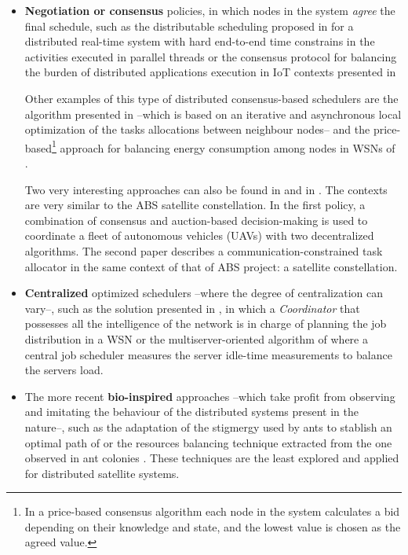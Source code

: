 \begin{itemize}
\item \textbf{Negotiation or consensus} policies, in which nodes in the system \emph{agree} the final schedule, such as the distributable scheduling proposed in \cite{anderson2007consensus} for a distributed real-time system with hard end-to-end time constrains in the activities executed in parallel threads or the consensus protocol for balancing the burden of distributed applications execution in IoT contexts presented in \cite{colistra2014problem} 

Other examples of this type of distributed consensus-based schedulers are the algorithm presented in \cite{pilloni2012decentralized} --which is based on an iterative and asynchronous local optimization of the tasks allocations between neighbour nodes-- and the price-based\footnote{In a price-based consensus algorithm each node in the system calculates a bid depending on their knowledge and state, and the lowest value is chosen as the agreed value.} approach for balancing energy consumption among nodes in WSNs of \cite{Edalat09}.

Two very interesting approaches can also be found in \cite{choi2009consensus} and in \cite{bonnet2008coordination}. The contexts are very similar to the ABS satellite constellation. In the first policy, a combination of consensus and auction-based decision-making is used to coordinate a fleet of autonomous vehicles (UAVs) with two decentralized algorithms. The second paper describes a communication-constrained task allocator in the same context of that of ABS project: a satellite constellation.

\item \textbf{Centralized} optimized schedulers --where the degree of centralization can vary--, such as the solution presented in \cite{pilloni2011deployment}, in which a \emph{Coordinator} that possesses all the intelligence of the network is in charge of planning the job distribution in a WSN or the multiserver-oriented algorithm of \cite{servers} where a central job scheduler measures the server idle-time measurements to balance the servers load.

\item The more recent \textbf{bio-inspired} approaches --which take profit from observing and imitating the behaviour of the distributed systems present in the nature--, such as the adaptation of the stigmergy used by ants to stablish an optimal path of \cite{Stigmergy} or the resources balancing technique extracted from the one observed in ant colonies \citep{antcollonies}. These techniques are the least explored and applied for distributed satellite systems.
\end{itemize}

